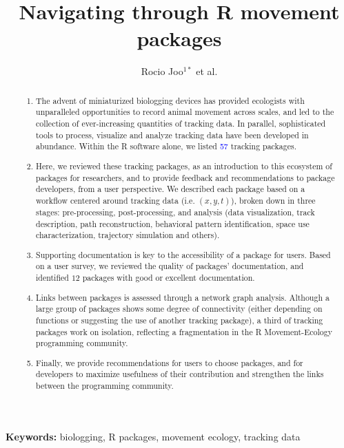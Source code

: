 \documentclass[a4paper,12pt]{article}
\title{Navigating through R movement packages}
\author{Rocio Joo$^{1*}$ et al.}
\begin{document}
\maketitle


\begin{abstract}
  \noindent \begin{enumerate}
  \item The advent of miniaturized biologging devices has provided ecologists with unparalleled opportunities to record animal movement across scales, and led to the collection of ever-increasing quantities of tracking data. In parallel, sophisticated tools to process, visualize and analyze tracking data have been developed in abundance. Within the R software alone, we listed \textcolor{blue}{57} tracking packages. 
  \item Here, we reviewed these tracking packages, as an introduction to this ecosystem of packages for researchers, and to provide feedback and recommendations to package developers, from a user perspective. We described each package based on a workflow centered around tracking data (i.e. $(x,y,t)$), broken down in three stages: pre-processing, post-processing, and analysis (data visualization, track description, path reconstruction, behavioral pattern identification, space use characterization, trajectory simulation and others).
  \item Supporting documentation is key to the accessibility of a package for users. Based on a user survey, we reviewed the quality of packages' documentation, and identified $12$ packages with good or excellent documentation. 
  \item Links between packages is assessed through a network graph analysis. Although a large group of packages shows some degree of connectivity (either depending on functions or suggesting the use of another tracking package), a third of tracking packages work on isolation, reflecting a fragmentation in the R Movement-Ecology programming community. 
  \item Finally, we provide recommendations for users to choose packages, and for developers to maximize usefulness of their contribution and strengthen the links between the programming community. %
  \end{enumerate}
\end{abstract}

\noindent \textbf{Keywords:} biologging, R packages, movement ecology, tracking data
\end{document}

